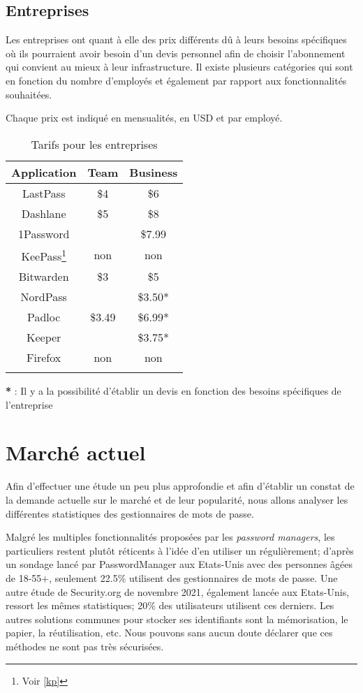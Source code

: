 \subsection{Entreprises}
Les entreprises ont quant à elle des prix différents dû à leurs besoins spécifiques où ils pourraient avoir besoin d'un devis personnel afin de choisir l'abonnement qui convient au mieux à leur infrastructure. Il existe plusieurs catégories qui sont en fonction du nombre d'employés et également par rapport aux fonctionnalités souhaitées. 

Chaque prix est indiqué en mensualités, en USD et par employé.
\begin{longtable}[h]{|c|c|c|}
	\hline
	Application & Team & Business \\
	\hline
	LastPass & \$4 & \$6  \\
	\hline
	Dashlane & \$5 & \$8 \\
	\hline
	1Password &  & \$7.99  \\
	\hline
	KeePass\footnote{Voir \ref{kp}} & non & non \\
	\hline
	Bitwarden & \$3 & \$5  \\
	\hline
	NordPass &  & \$3.50* \\
	\hline
	Padloc & \$3.49 & \$6.99* \\
	\hline
	Keeper & & \$3.75* \\
	\hline
	Firefox & non & non \\
    \hline
	\caption{Tarifs pour les entreprises}
\end{longtable}
\textbf{*}\hspace{0.1cm} :  Il y a la possibilité d'établir un devis en fonction des besoins spécifiques de l'entreprise \\

\section{Marché actuel}
Afin d'effectuer une étude un peu plus approfondie et afin d'établir un constat de la demande actuelle sur le marché et de leur popularité, nous allons analyser les différentes statistiques des gestionnaires de mots de passe. 

Malgré les multiples fonctionnalités proposées par les \textit{password managers}, les particuliers restent plutôt réticents à l'idée d'en utiliser un régulièrement; d'après un sondage lancé par PasswordManager\cite{PMC} aux Etats-Unis avec des personnes âgées de 18-55+, seulement 22.5\% utilisent des gestionnaires de mots de passe. Une autre étude de Security.org\cite{PM21} de novembre 2021, également lancée aux Etats-Unis, ressort les mêmes statistiques; 20\% des utilisateurs utilisent ces derniers. Les autres solutions communes pour stocker ses identifiants sont la mémorisation, le papier, la réutilisation, etc. Nous pouvons sans aucun doute déclarer que ces méthodes ne sont pas très sécurisées. 

